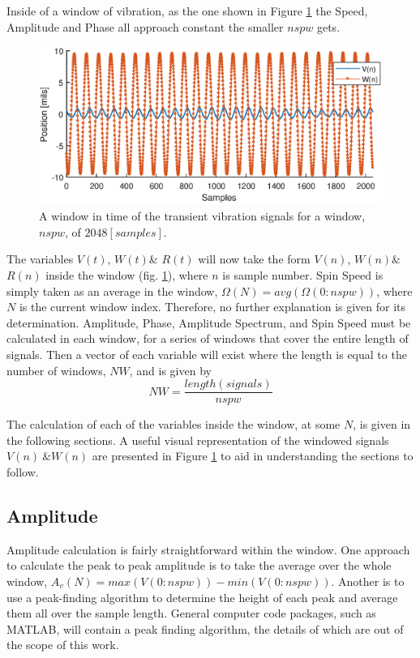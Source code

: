 Inside of a window of vibration, as the one shown in Figure \ref{fig:WindowedData} the Speed, Amplitude and Phase all approach constant the smaller $ nspw $ gets.\par
\begin{figure}
	\centering
	\includegraphics{./figures/SSTime.eps}
	\caption{A window in time of the transient vibration signals for a window, $ nspw $, of $ 2048[samples] $.}
	\label{fig:WindowedData}
\end{figure}
The variables $ V(t) $, $ W(t) $\& $ R(t) $ will now take the form $ V(n) $, $ W(n) $\& $ R(n) $ inside the window (fig. \ref{fig:WindowedData}), where $ n $ is sample number. Spin Speed is simply taken as an average in the window, $ \Omega(N)=avg(\Omega(0:nspw)) $, where $ N $ is the current window index. Therefore, no further explanation is given for its determination. Amplitude, Phase, Amplitude Spectrum, and Spin Speed must be calculated in each window, for a series of windows that cover the entire length of signals. Then a vector of each variable will exist where the length is equal to the number of windows, $ NW $, and is given by
\begin{equation*}
NW = \frac{length(signals)}{nspw}
\end{equation*}\par 
The calculation of each of the variables inside the window, at some $ N $, is given in the following sections. A useful visual representation of the windowed signals $ V(n)\ \& W(n) $ are presented in Figure \ref{fig:WindowedData} to aid in understanding the sections to follow.
\subsection{Amplitude}
Amplitude calculation is fairly straightforward within the window. One approach to calculate the peak to peak amplitude is to take the average over the whole window, $ A_v(N) = max(V(0:nspw))-min(V(0:nspw)) $. Another is to use a peak-finding algorithm to determine the height of each peak and average them all over the sample length. General computer code packages, such as MATLAB,  will contain a peak finding algorithm, the details of which are out of the scope of this work.
